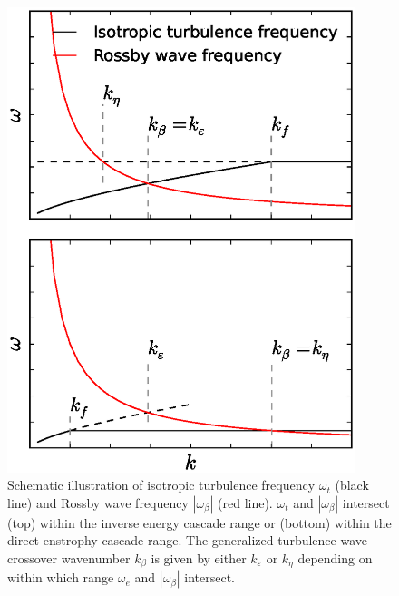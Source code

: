 \documentclass{ametsoc}
\begin{document}
\begin{figure}
\begin{center}
\includegraphics[width=4in]{crossover_scale_illustrate}\caption{Schematic illustration of isotropic turbulence frequency $\omega_{t}$
(black line) and Rossby wave frequency $|\omega_{\beta}|$ (red line).
$\omega_{t}$ and $|\omega_{\beta}|$ intersect (top) within the
inverse energy cascade range or (bottom) within the direct enstrophy
cascade range. The generalized turbulence-wave crossover wavenumber
$k_{\beta}$ is given by either $k_{\varepsilon}$ or $k_{\eta}$
depending on within which range $\omega_{e}$ and $|\omega_{\beta}|$ intersect.}
\label{crossover_illustrate}
\end{center}
\end{figure}
\end{document}
